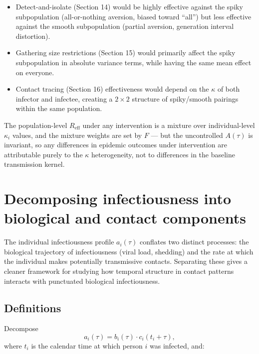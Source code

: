 \documentclass[11pt]{article}
\begin{document}
\begin{itemize}
\item Detect-and-isolate (Section 14) would be highly effective against the spiky subpopulation (all-or-nothing aversion, biased toward ``all'') but less effective against the smooth subpopulation (partial aversion, generation interval distortion).
\item Gathering size restrictions (Section 15) would primarily affect the spiky subpopulation in absolute variance terms, while having the same mean effect on everyone.
\item Contact tracing (Section 16) effectiveness would depend on the $\kappa$ of both infector and infectee, creating a $2 \times 2$ structure of spiky/smooth pairings within the same population.
\end{itemize}

The population-level $R_{\text{eff}}$ under any intervention is a mixture over individual-level $\kappa_i$ values, and the mixture weights are set by $F$ --- but the uncontrolled $A(\tau)$ is invariant, so any differences in epidemic outcomes under intervention are attributable purely to the $\kappa$ heterogeneity, not to differences in the baseline transmission kernel.

\section{Decomposing infectiousness into biological and contact components}

The individual infectiousness profile $a_i(\tau)$ conflates two distinct processes: the biological trajectory of infectiousness (viral load, shedding) and the rate at which the individual makes potentially transmissive contacts. Separating these gives a cleaner framework for studying how temporal structure in contact patterns interacts with punctuated biological infectiousness.

\subsection{Definitions}

Decompose
\[
a_i(\tau) = b_i(\tau) \cdot c_i(t_i + \tau),
\]
where $t_i$ is the calendar time at which person $i$ was infected, and:
\end{document}
